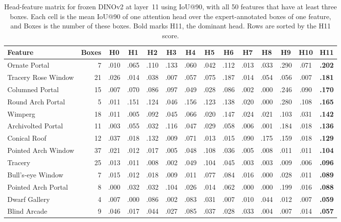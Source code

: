 \documentclass[lineno,pdflatex,sn-mathphys-num]{sn-jnl}%
\theoremstyle{thmstyleone}%
\theoremstyle{thmstyletwo}%
\theoremstyle{thmstylethree}%
\begin{document}
\begin{appendices}
\begin{table}[!htbp]
\centering
\caption{Head-feature matrix for frozen DINOv2 at layer~11 using IoU@90, with all 50 features that have at least three boxes. Each cell is the mean IoU@90 of one attention head over the expert-annotated boxes of one feature, and Boxes is the number of these boxes. Bold marks H11, the dominant head. Rows are sorted by the H11 score.\label{table appendix head feature dinov2}}
\setlength{\tabcolsep}{3pt}
\begin{tabular}{@{}lrcccccccccccc@{}}
\toprule
Feature & Boxes & H0 & H1 & H2 & H3 & H4 & H5 & H6 & H7 & H8 & H9 & H10 & \textbf{H11} \\ \midrule
Ornate Portal & 7 & .010 & .065 & .110 & .133 & .060 & .042 & .112 & .013 & .033 & .290 & .071 & \textbf{.202} \\
Tracery Rose Window & 21 & .026 & .014 & .038 & .007 & .057 & .075 & .187 & .014 & .054 & .056 & .007 & \textbf{.181} \\
Columned Portal & 15 & .007 & .070 & .086 & .097 & .049 & .028 & .086 & .002 & .000 & .246 & .090 & \textbf{.170} \\
Round Arch Portal & 5 & .011 & .151 & .124 & .046 & .156 & .123 & .138 & .020 & .000 & .280 & .108 & \textbf{.165} \\
Wimperg & 18 & .011 & .005 & .092 & .045 & .066 & .020 & .147 & .024 & .021 & .103 & .031 & \textbf{.142} \\
Archivolted Portal & 11 & .003 & .055 & .032 & .116 & .047 & .029 & .058 & .006 & .001 & .184 & .018 & \textbf{.136} \\
Conical Roof & 12 & .037 & .018 & .132 & .009 & .071 & .013 & .015 & .090 & .175 & .159 & .018 & \textbf{.129} \\
Pointed Arch Window & 37 & .021 & .012 & .017 & .005 & .048 & .108 & .036 & .005 & .008 & .011 & .011 & \textbf{.104} \\
Tracery & 25 & .013 & .011 & .008 & .002 & .049 & .104 & .045 & .003 & .003 & .009 & .006 & \textbf{.096} \\
Bull's-eye Window & 7 & .015 & .012 & .018 & .009 & .011 & .077 & .084 & .016 & .000 & .028 & .011 & \textbf{.089} \\
Pointed Arch Portal & 8 & .000 & .032 & .032 & .104 & .026 & .014 & .062 & .000 & .000 & .199 & .016 & \textbf{.088} \\
Dwarf Gallery & 4 & .007 & .000 & .086 & .002 & .083 & .031 & .007 & .010 & .044 & .012 & .007 & \textbf{.059} \\
Blind Arcade & 9 & .046 & .017 & .044 & .027 & .085 & .037 & .028 & .033 & .004 & .007 & .014 & \textbf{.057} \\

\end{tabular}
\end{table}
\end{appendices}
\end{document}
